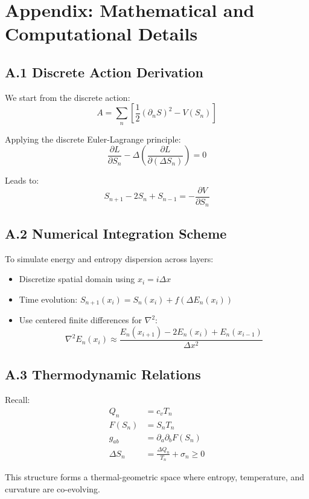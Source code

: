
\appendix
\section{Appendix: Mathematical and Computational Details}

\subsection*{A.1 Discrete Action Derivation}

We start from the discrete action:
\begin{equation*}
A = \sum_n \left[ \frac{1}{2} (\partial_n S)^2 - V(S_n) \right]
\end{equation*}

Applying the discrete Euler-Lagrange principle:
\begin{equation*}
\frac{\partial L}{\partial S_n} - \Delta \left( \frac{\partial L}{\partial (\Delta S_n)} \right) = 0
\end{equation*}

Leads to:
\begin{equation*}
S_{n+1} - 2S_n + S_{n-1} = - \frac{\partial V}{\partial S_n}
\end{equation*}

\subsection*{A.2 Numerical Integration Scheme}

To simulate energy and entropy dispersion across layers:
\begin{itemize}
  \item Discretize spatial domain using $x_i = i \Delta x$
  \item Time evolution: $S_{n+1}(x_i) = S_n(x_i) + f(\Delta E_n(x_i))$
  \item Use centered finite differences for $\nabla^2$:
\begin{equation*}
\nabla^2 E_n(x_i) \approx \frac{E_n(x_{i+1}) - 2E_n(x_i) + E_n(x_{i-1})}{\Delta x^2}
\end{equation*}
\end{itemize}

\subsection*{A.3 Thermodynamic Relations}

Recall:
\begin{align*}
Q_n &= c_v T_n \\
F(S_n) &= S_n T_n \\
g_{ab} &= \partial_a \partial_b F(S_n) \\
\Delta S_n &= \frac{\Delta Q_n}{T_n} + \sigma_n \geq 0
\end{align*}

This structure forms a thermal-geometric space where entropy, temperature, and curvature are co-evolving.

